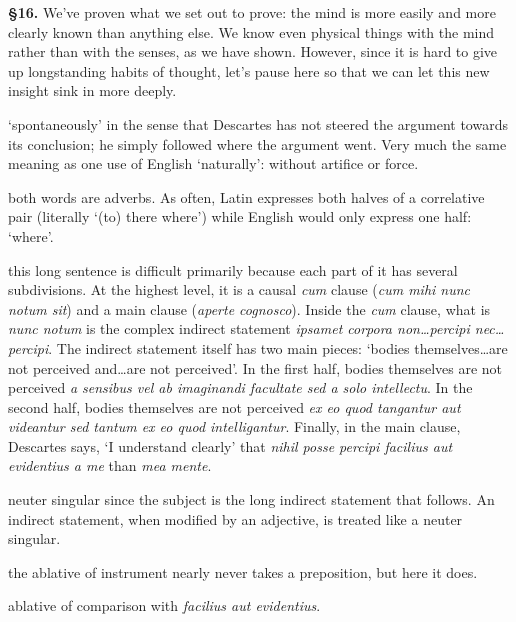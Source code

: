 \textbf{§16.} We've proven what we set out to prove: the mind is more easily and more clearly known than anything else. We know even physical things with the mind rather than with the senses, as we have shown. However, since it is hard to give up longstanding habits of thought, let's pause here so that we can let this new insight sink in more deeply.

 `spontaneously' in the sense that Descartes has not steered the argument towards its conclusion; he simply followed where the argument went. Very much the same meaning as one use of English `naturally': without artifice or force.

 both words are adverbs. As often, Latin expresses both halves of a correlative pair (literally `(to) there where') while English would only express one half: `where'.

 this long sentence is difficult primarily because each part of it has several subdivisions. At the highest level, it is a causal \textit{cum} clause (\textit{cum mihi nunc notum sit}) and a main clause (\textit{aperte cognosco}). Inside the \textit{cum} clause, what is \textit{nunc notum} is the complex indirect statement \textit{ipsamet corpora non\dots percipi nec\dots percipi}. The indirect statement itself has two main pieces: `bodies themselves\dots are not perceived and\dots are not perceived'. In the first half, bodies themselves are not perceived \textit{a sensibus vel ab imaginandi facultate sed a solo intellectu}. In the second half, bodies themselves are not perceived \textit{ex eo quod tangantur aut videantur sed tantum ex eo quod intelligantur}. Finally, in the main clause, Descartes says, `I understand clearly' that \textit{nihil posse percipi facilius aut evidentius a me} than \textit{mea mente}.

 neuter singular since the subject is the long indirect statement that follows. An indirect statement, when modified by an adjective, is treated like a neuter singular.

 the ablative of instrument nearly never takes a preposition, but here it does.

 ablative of comparison with \textit{facilius aut evidentius}.

